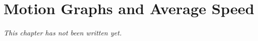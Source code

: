\chapter{Motion Graphs and Average Speed}\label{ch:g7:motion-average-speed}


\emph{This chapter has not been written yet.}
